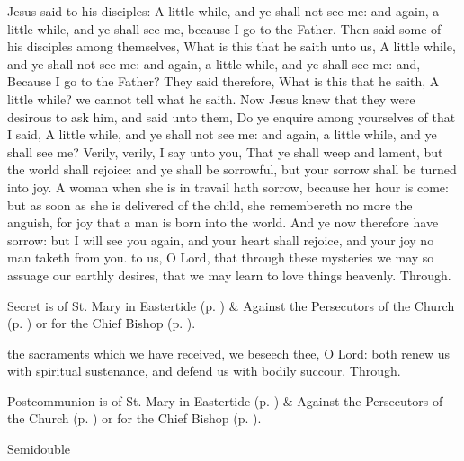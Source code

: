  Jesus said to his disciples: A little while, and ye shall not see me: and again, a little while, and ye shall see me, because I go to the Father. Then said some of his disciples among themselves, What is this that he saith unto us, A little while, and ye shall not see me: and again, a little while, and ye shall see me: and, Because I go to the Father? They said therefore, What is this that he saith, A little while? we cannot tell what he saith. Now Jesus knew that they were desirous to ask him, and said unto them, Do ye enquire among yourselves of that I said, A little while, and ye shall not see me: and again, a little while, and ye shall see me? Verily, verily, I say unto you, That ye shall weep and lament, but the world shall rejoice: and ye shall be sorrowful, but your sorrow shall be turned into joy. A woman when she is in travail hath sorrow, because her hour is come: but as soon as she is delivered of the child, she remembereth no more the anguish, for joy that a man is born into the world. And ye now therefore have sorrow: but I will see you again, and your heart shall rejoice, and your joy no man taketh from you.
\secret
{} to us, O Lord, that through these mysteries we may so assuage our earthly desires, that we may learn to love things heavenly. Through.

\begin{rubric}
     Secret is of St. Mary in Eastertide (p. \pageref{SPMaryInEaster}) \&  Against the Persecutors of the Church (p. \pageref{SPAgainst}) or for the Chief Bishop (p. \pageref{SPChiefBishop}).
\end{rubric}
\postcommunion
{} the sacraments which we have received, we beseech thee, O Lord: both renew us with spiritual sustenance, and defend us with bodily succour. Through.
\begin{rubric}
     Postcommunion is of St. Mary in Eastertide (p. \pageref{SPMaryInEaster}) \&  Against the Persecutors of the Church (p. \pageref{SPAgainst}) or for the Chief Bishop (p. \pageref{SPChiefBishop}).
\end{rubric}


\begin{inhead}
    {Semidouble}
\end{inhead}

